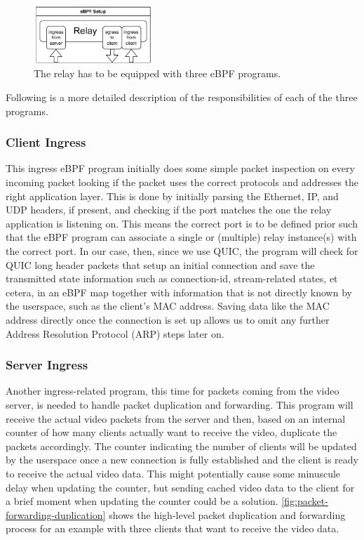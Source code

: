 \vspace{0.5cm}
\begin{figure}[H]
    \centering
    \includegraphics[width=0.4\textwidth]{figures/03_fast_relays/ebpf-setup.drawio.pdf}
    \caption[Types of eBPF programs at relay]{The relay has to be equipped with three eBPF programs.}\label{fig:ebpf-programs}
\end{figure}

Following is a more detailed description of the responsibilities of each of the three programs.
\subsubsection{Client Ingress} 
This ingress eBPF program initially does some simple packet inspection on every incoming packet 
looking if the packet uses the correct protocols and addresses the right application layer.
This is done by initially parsing the Ethernet, IP, and UDP headers, if present, and checking if 
the port matches the one the relay application is listening on.
This means the correct port is to be defined prior such that the eBPF program can associate 
a single or (multiple) relay instance(s) with the correct port.
In our case, then, since we use QUIC, the program will check for QUIC long header packets that 
setup an initial connection and save the transmitted state information such as connection-id, 
stream-related states, et cetera, in an eBPF map together with information that is not directly known
by the userspace, such as the client's MAC address.
Saving data like the MAC address directly once the connection is set up allows us to omit any further 
Address Resolution Protocol (ARP) steps later on. 
\subsubsection{Server Ingress}
Another ingress-related program, this time for packets coming from the video server, is needed
to handle packet duplication and forwarding.
This program will receive the actual video packets from the server and then, based on an internal 
counter of how many clients actually want to receive the video, duplicate the packets accordingly.
The counter indicating the number of clients will be updated by the userspace once a new connection 
is fully established and the client is ready to receive the actual video data.
This might potentially cause some minuscule delay when updating the counter, but sending cached 
video data to the client for a brief moment when updating the counter could be a solution. %
\autoref{fig:packet-forwarding-duplication} shows the high-level packet duplication and forwarding process 
for an example with three clients that want to receive the video data.

